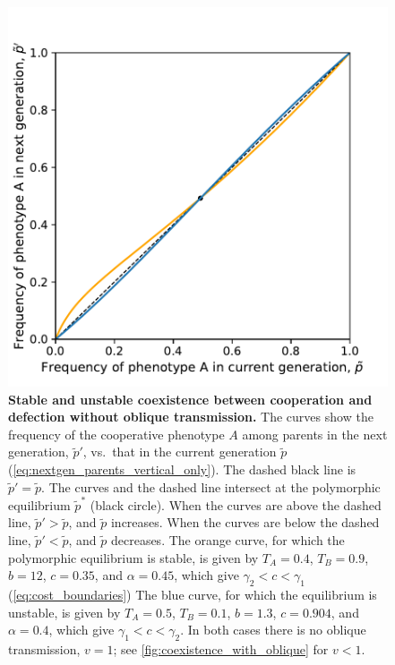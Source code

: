 \documentclass[12pt]{extarticle}
\begin{document}
{%
\begin{figure}[htb]
\centering
\includegraphics[scale = 0.75]{coexistence_without_oblique.pdf}
\caption{\textbf{Stable and unstable coexistence between cooperation and defection without oblique transmission.}
  The curves show the frequency of the cooperative phenotype $A$ among parents in the next generation, $\tilde{p}'$, vs.\ that in the current generation $\tilde{p}$ (\autoref{eq:nextgen_parents_vertical_only}).
  The dashed black line is $\tilde{p}'=\tilde{p}$.
  The curves and the dashed line intersect at the polymorphic equilibrium $\tilde{p}^*$ (black circle).
  When the curves are above the dashed line, $\tilde{p}'>\tilde{p}$, and $\tilde{p}$ increases.
  When the curves are below the dashed line, $\tilde{p}'<\tilde{p}$, and $\tilde{p}$ decreases.
  The orange curve, for which the polymorphic equilibrium is stable, is given by $T_A = 0.4$, $T_B = 0.9$, $b = 12$, $c=0.35$, and $\alpha = 0.45$, which give $\gamma_2<c<\gamma_1$ (\autoref{eq:cost_boundaries})
  The blue curve, for which the equilibrium is unstable, is given by $T_A = 0.5$, $T_B = 0.1$, $b = 1.3$, $c=0.904$, and $\alpha = 0.4$, which give $\gamma_1<c<\gamma_2$.
  In both cases there is no oblique transmission, $v=1$; see \autoref{fig:coexistence_with_oblique} for $v<1$.
  }
\label{fig:coexistence_without_oblique}
\end{figure}

}
\end{document}
